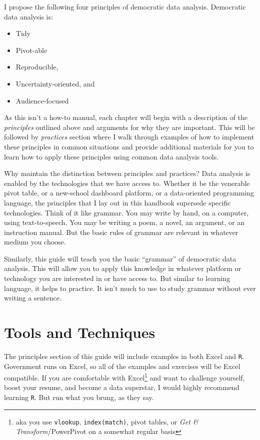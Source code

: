 \documentclass[
]{book}
\providecommand{\tightlist}{%
  \setlength{\itemsep}{0pt}\setlength{\parskip}{0pt}}
\begin{document}
I propose the following four principles of democratic data analysis. Democratic data analysis is:

\begin{itemize}
\tightlist
\item
  Tidy
\item
  Pivot-able
\item
  Reproducible,
\item
  Uncertainty-oriented, and
\item
  Audience-focused
\end{itemize}

As this isn't a how-to manual, each chapter will begin with a description of the \emph{principles} outlined above and arguments for why they are important. This will be followed by \emph{practices} section where I walk through examples of how to implement these principles in common situations and provide additional materials for you to learn how to apply these principles using common data analysis tools.

Why maintain the distinction between principles and practices? Data analysis is enabled by the technologies that we have access to. Whether it be the venerable pivot table, or a new-school dashboard platform, or a data-oriented programming language, the principles that I lay out in this handbook supersede specific technologies. Think of it like grammar. You may write by hand, on a computer, using text-to-speech. You may be writing a poem, a novel, an argument, or an instruction manual. But the basic rules of grammar are relevant in whatever medium you choose.

Similarly, this guide will teach you the basic ``grammar'' of democratic data analysis. This will allow you to apply this knowledge in whatever platform or technology you are interested in or have access to. But similar to learning language, it helps to practice. It isn't much to use to study grammar without ever writing a sentence.

\hypertarget{tools-and-techniques}{%
\section{Tools and Techniques}\label{tools-and-techniques}}

The principles section of this guide will include examples in both Excel and \texttt{R}. Government runs on Excel, so all of the examples and exercises will be Excel compatible. If you are comfortable with Excel\footnote{aka you use \texttt{vlookup}, \texttt{index(match)}, pivot tables, or \emph{Get \& Transform}/PowerPivot on a somewhat regular basis} and want to challenge yourself, boost your resume, and become a data superstar, I would highly recommend learning \texttt{R}. But run what you brung, as they say.
\end{document}
